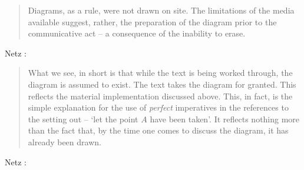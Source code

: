 \documentclass{article}
\begin{document}
\begin{quote}
Diagrams, as a rule, were not drawn on site.
The limitations of the media available suggest, rather, the preparation
of the diagram prior to the communicative act -- a consequence of the
inability to erase.
\end{quote}

Netz \cite[p.~25]{netz}:

\begin{quote}
What we see, in short is that while the text is being worked through,
the diagram is assumed to exist. The text takes the diagram for granted.
This reflects the material implementation discussed above. This, in
fact, is the simple explanation for the use of {\em perfect} imperatives in the
references to the setting out -- `let the point $A$ have been taken'. It
reflects nothing more than the fact that, by the time one comes to
discuss the diagram, it has already been drawn.
\end{quote}

Netz \cite[pp.~94--95]{netz}:
\end{document}
